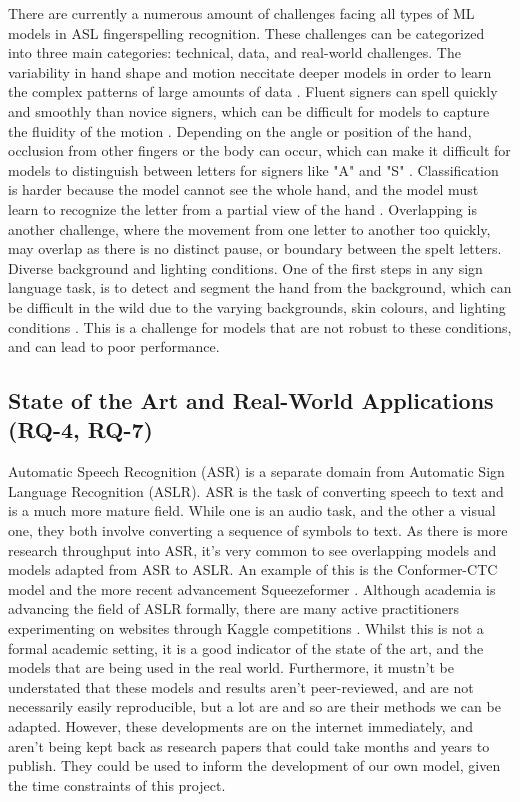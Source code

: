 There are currently a numerous amount of challenges facing all types of ML models in ASL fingerspelling recognition. These challenges can be categorized into three main categories: technical, data, and real-world challenges. The variability in hand shape and motion neccitate deeper models in order to learn the complex patterns of large amounts of data \cite{gajurelFineGrainedVisualAttention2021}.
Fluent signers can spell quickly and smoothly than novice signers, which can be difficult for models to capture the fluidity of the motion \cite{gajurelFineGrainedVisualAttention2021}.
Depending on the angle or position of the hand, occlusion from other fingers or the body can occur, which can make it difficult for models to distinguish between letters for signers like "A" and "S" \cite{shiAmericanSignLanguage2018}. Classification is harder because the model cannot see the whole hand, and the model must learn to recognize the letter from a partial view of the hand \cite{shiAmericanSignLanguage2018}. Overlapping is another challenge, where the movement from one letter to another too quickly, may overlap as there is no distinct pause, or boundary between the spelt letters.
Diverse background and lighting conditions.
One of the first steps in any sign language task, is to detect and segment the hand from the background, which can be difficult in the wild due to the varying backgrounds, skin colours, and lighting conditions \cite{shiFingerspellingRecognitionWild2019}. This is a challenge for models that are not robust to these conditions, and can lead to poor performance.

\subsection{State of the Art and Real-World Applications (RQ-4, RQ-7)}

Automatic Speech Recognition (ASR) is a separate domain from Automatic Sign Language Recognition (ASLR). ASR is the task of converting speech to text and is a much more mature field. While one is an audio task, and the other a visual one, they both involve converting a sequence of symbols to text. As there is more research throughput into ASR, it's very common to see overlapping models and models adapted from ASR to ASLR. An example of this is the Conformer-CTC model \cite{gulatiConformerConvolutionaugmentedTransformer2020} and the more recent advancement Squeezeformer \cite{kimSqueezeformerEfficientTransformer2022}. Although academia is advancing the field of ASLR formally, there are many active practitioners experimenting on websites through Kaggle competitions \cite{kaggleAslFinger}. Whilst this is not a formal academic setting, it is a good indicator of the state of the art, and the models that are being used in the real world.
Furthermore, it mustn't be understated that these models and results aren't peer-reviewed, and are not necessarily easily reproducible, but a lot are and so are their methods we can be adapted. However, these developments are on the internet immediately, and aren't being kept back as research papers that could take months and years to publish. They could be used to inform the development of our own model, given the time constraints of this project.

